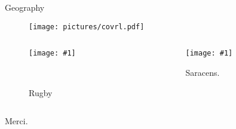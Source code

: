 \documentclass{beamer}
\newcommand{\insertfigure}[3] {

\begin{minipage}[b]{#2\linewidth}
    \texttt{[image: \#1]} 
    \caption{#3} 
\end{minipage} }
\newcommand{\insertf}[2]{\insertfigure{#1}{0.9}{#2}}
\begin{document}
\begin{frame}{Geography}
  \begin{figure}
  
  \begin{minipage}[b]{0.7\linewidth}
     \begin{center}
	 \texttt{[image: pictures/covrl.pdf]}
	 
  
    \end{center}

    
  \end{minipage} 
  \end{figure}
  \begin{minipage}{0.6\linewidth}
  
  \begin{columns}[c] %
\begin{column}{.6\textwidth}
\begin{figure}
  
 \insertf{pictures/rugby.pdf}{Rugby}
  \

 
\end{figure}
\end{column}%
\begin{column}{.7\textwidth}

\begin{figure}
  
  \insertf{pictures/saracens.pdf}{Saracens.}
  \pause
 
\end{figure}

  \end{column}%
%

  \end{columns}

\end{minipage}

\end{frame} 

\begin{frame}{Merci.}
 
\end{frame}
\end{document}
